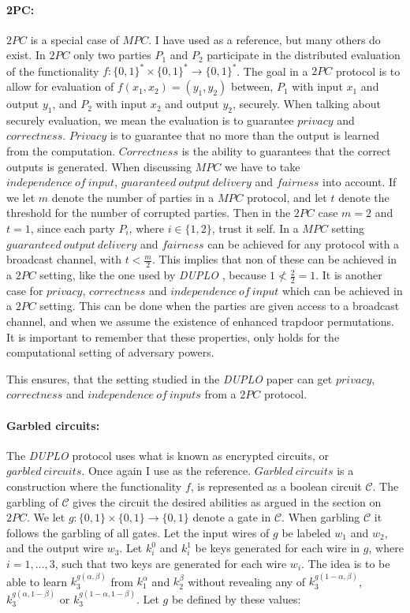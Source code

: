 \documentclass[twoside,11pt,openright]{report}
\newcommand{\DUPLO}{\textit{DUPLO} }
\begin{document}
\paragraph{2PC:}
$2PC$ is a special case of $MPC$. I have used \cite{estpp} as a reference, but many others do exist. In $2PC$ only two parties $P_1$ and $P_2$ participate in the distributed evaluation of the functionality $f: \{0,1\}^* \times \{0,1\}^* \to \{0,1\}^*$. The goal in a $2PC$ protocol is to allow for evaluation of $f(x_1,x_2)=(y_1,y_2)$ between, $P_1$ with input $x_1$ and output $y_1$, and $P_2$ with input $x_2$ and output $y_2$, securely. When talking about securely evaluation, we mean the evaluation is to guarantee $privacy$ and $correctness$. $Privacy$ is to guarantee that no more than the output is learned from the computation. $Correctness$ is the ability to guarantees that the correct outputs is generated. When discussing $MPC$ we have to take $independence~of~input$, $guaranteed~output~delivery$ and $fairness$ into account. If we let $m$ denote the number of parties in a $MPC$ protocol, and let $t$ denote the threshold for the number of corrupted parties. Then in the $2PC$ case $m=2$ and $t=1$, since each party $P_i$, where $i\in\{1,2\}$, trust it self. In a $MPC$ setting $guaranteed~output~delivery$ and $fairness$ can be achieved for any protocol with a broadcast channel, with $t<\frac{m}{2}$. This implies that non of these can be achieved in a $2PC$ setting, like the one used by \DUPLO, because $1\not<\frac{2}{2}=1$. It is another case for $privacy$, $correctness$ and $independence~of~input$ which can be achieved in a $2PC$ setting. This can be done when the parties are given access to a broadcast channel, and when we assume the existence of enhanced trapdoor permutations. It is important to remember that these properties, only holds for the computational setting of adversary powers.

This ensures, that the setting studied in the \DUPLO paper can get $privacy$, $correctness$ and $independence~of~inputs$ from a $2PC$ protocol.

\paragraph{Garbled circuits:} 
The \DUPLO protocol uses what is known as encrypted circuits, or $garbled~circuits$. Once again I use \cite{estpp} as the reference. $Garbled~circuits$ is a construction where the functionality $f$, is represented as a boolean circuit $\mathcal{C}$. The garbling of $\mathcal{C}$ gives the circuit the desired abilities as argued in the section on $2PC$. We let $g:\{0,1\}\times \{0,1\} \to \{0,1\}$ denote a gate in $\mathcal{C}$. When garbling $\mathcal{C}$ it follows the garbling of all gates. Let the input wires of $g$ be labeled $w_1$ and $w_2$, and the output wire $w_3$. Let $k^0_i$ and $k^1_i$ be keys generated for each wire in $g$, where $i=1,\dots,3$, such that two keys are generated for each wire $w_i$. The idea is to be able to learn $k^{g(\alpha,\beta)}_3$ from $k^\alpha_1$ and $k^\beta_2$ without revealing any of $k^{g(1-\alpha,\beta)}_3$, $k^{g(\alpha,1-\beta)}_3$ or $k^{g(1-\alpha,1-\beta)}_3$. Let $g$ be defined by these values:
\end{document}
